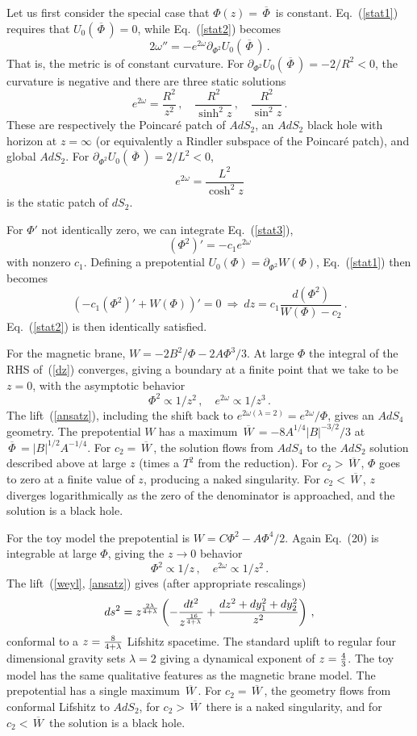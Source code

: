 \documentclass[12pt]{article}
\newcommand{\be}{\begin{equation}}
\newcommand{\ee}{\end{equation}}
\newcommand{\OL}[1]{\,\overline{\! #1 \!}\,}
\begin{document}
Let us first consider the special case that $\Phi(z) = \OL\Phi$ is constant.  Eq.~(\ref{stat1}) requires that  $U_0(\OL\Phi) = 0$, while Eq.~(\ref{stat2}) becomes
\begin{equation}
2 \omega''   = - e^{2 \omega }  \partial_{\Phi^2} U_{0}(\OL\Phi) \,.
\end{equation}
That is, the metric is of constant curvature.  For $\partial_{\Phi^2} U_{0}(\OL\Phi) = -2 /R^2 < 0$, the curvature is negative and there are three static solutions
\be
e^{2\omega} = \frac{R^2}{z^2} \,,\quad \frac{R^2}{\sinh^2 z} \,, \quad \frac{R^2}{\sin^2 z} \,. \label{statmets}
\ee
These are respectively the Poincar\'e patch of $AdS_2$, an $AdS_2$ black hole with horizon at $z = \infty$ (or equivalently a Rindler subspace of the Poincar\'e patch), and global $AdS_2$.  For $\partial_{\Phi^2} U_{0}(\OL\Phi) = 2 /L^2 < 0$,
\be
e^{2\omega} = \frac{L^2}{\cosh^2 z}
\ee
is the static patch of $dS_2$.

For $\Phi'$ not identically zero, we can integrate Eq.~(\ref{stat3}),
\be
(\Phi^2)' = -c_1 e^{2\omega}
\ee
with nonzero $c_1$.  Defining a prepotential $U_{0}(\Phi) = \partial_{\Phi^2} W(\Phi)$, Eq.~(\ref{stat1}) then becomes
\be
\left( -c_1 (\Phi^2)' + W(\Phi)\right)' = 0 \ \Rightarrow\             dz = c_1 \frac{d(\Phi^2)}{W(\Phi) - c_2} \,.
\label{dz}
\ee
 Eq.~(\ref{stat2}) is then identically satisfied.  
 
For the magnetic brane, $W= -2B^2/\Phi - 2 A \Phi^3/3$.  At large $\Phi$ the integral of the RHS of~(\ref{dz}) converges, giving a boundary at a finite point that we take to be $z=0$, with the asymptotic behavior
\be
\Phi^2 \propto 1/ z^2\,, \quad e^{2\omega} \propto 1/ z^3 \,.
\ee
The lift~(\ref{ansatz}), including the shift back to $e^{2\omega({\lambda = 2})} = e^{2\omega}/\Phi$,
  gives an $AdS_4$ geometry.  The prepotential $W$ has a maximum  $\OL W = -8 A^{1/4} |B|^{-3/2}/3$ at $\OL\Phi= |B|^{1/2} A^{-1/4}$.  For $c_2 = \OL W$, the solution flows from $AdS_4$ to the $AdS_2$ solution described above at large $z$ (times a $T^2$ from the reduction).  For $c_2 > \OL W$, $\Phi$ goes to zero at a finite value of $z$, producing a naked singularity.  For $c_2 < \OL W$, $z$ diverges logarithmically as the zero of the denominator is approached, and the solution is a black hole.  

For the toy model the prepotential is $W =  C\Phi^2 - A \Phi^4/2$.  Again Eq.~(20) is integrable at large $\Phi$, giving the $z \to 0$ behavior
\be
\Phi^2 \propto 1/z\,,\quad e^{2\omega} \propto 1/z^2\,.
\ee
The lift~(\ref{weyl}, \ref{ansatz}) gives (after appropriate rescalings)
\be
ds^2 = z^{2 \lambda \over 4 + \lambda } \left( -{ dt^2 \over z^{  16 \over 4 + \lambda }} + {dz^2 + dy_1^2 + dy_2^2 \over z^2} \right) \,,
\ee
conformal to a $z={ 8 \over 4 + \lambda}$ Lifshitz spacetime. {The standard uplift to regular four dimensional gravity sets $\lambda = 2$ giving a dynamical exponent of $z = {4 \over 3}$.} The toy model has the same qualitative features as the magnetic brane model.  The prepotential has a single maximum $\OL W$.  For $c_2 = \OL W$, the geometry flows from conformal Lifshitz to $AdS_2$, for $c_2 > \OL W $ there is a naked singularity, and for $c_2 < \OL W $ the solution is a black hole.
\end{document}
